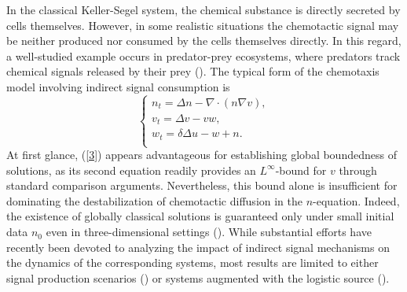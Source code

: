 \documentclass[12pt]{article}
\theoremstyle{plain}
\theoremstyle{definition}
\numberwithin{equation}{section}
\begin{document}
In the classical Keller-Segel system, the chemical substance is  %
 directly secreted by cells themselves. However, in some realistic situations
  the
chemotactic signal may be neither produced nor consumed by the cells themselves directly. In this regard, a well-studied example occurs in predator-prey ecosystems, where predators track chemical signals released by their prey (\cite{TelloWrzosek(2017),Strohm(2013),Surulescu(2021)}). %
   The typical form of the chemotaxis model involving indirect signal consumption is
\begin{equation}\label{3}
\begin{cases}
n_t=\Delta n-\nabla\cdot(n\nabla v),\\
v_t=\Delta v-vw,\\
w_t=\delta\Delta u-w+n.\\
\end{cases}
\end{equation}
At first glance, (\ref{3}) appears advantageous for establishing global boundedness of solutions, as its  second equation readily provides an $L^\infty$-bound for $v$ through standard comparison arguments. Nevertheless,
this bound alone is insufficient for dominating
 the destabilization of chemotactic  diffusion in the $n$-equation. Indeed, the existence of globally classical solutions is guaranteed only under small initial data $n_0$ even in three-dimensional settings (\cite{Fuest(2019)}). While substantial efforts have recently been devoted to analyzing  the impact of indirect signal mechanisms on the dynamics of the corresponding systems, most results are limited to either signal production scenarios (\cite{TaoWinkler(2017),Daicvpde(2023),Herrero(1997), Winkler(2013), Fujie(2017)}) or systems augmented with  the logistic source (\cite{Xing(2021),Liu Li Huang(2020)}).
\end{document}
